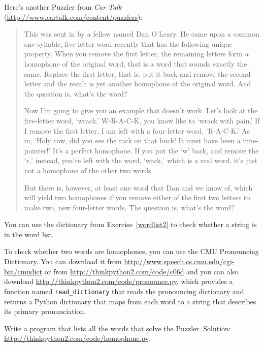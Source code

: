 \documentclass[10pt]{book}
\begin{document}
\begin{exercise}

Here's another Puzzler from {\em Car Talk}
(\url{http://www.cartalk.com/content/puzzlers}):

\begin{quote}
This was sent in by a fellow named Dan O'Leary. He came upon a common
one-syllable, five-letter word recently that has the following unique
property. When you remove the first letter, the remaining letters form
a homophone of the original word, that is a word that sounds exactly
the same. Replace the first letter, that is, put it back and remove
the second letter and the result is yet another homophone of the
original word. And the question is, what's the word?

Now I'm going to give you an example that doesn't work. Let's look at
the five-letter word, `wrack.' W-R-A-C-K, you know like to `wrack with
pain.' If I remove the first letter, I am left with a four-letter
word, 'R-A-C-K.' As in, `Holy cow, did you see the rack on that buck!
It must have been a nine-pointer!' It's a perfect homophone. If you
put the `w' back, and remove the `r,' instead, you're left with the
word, `wack,' which is a real word, it's just not a homophone of the
other two words.

But there is, however, at least one word that Dan and we know of,
which will yield two homophones if you remove either of the first two
letters to make two, new four-letter words. The question is, what's
the word?
\end{quote}

You can use the dictionary from Exercise~\ref{wordlist2} to check
whether a string is in the word list.

To check whether two words are homophones, you can use the CMU
Pronouncing Dictionary.  You can download it from
\url{http://www.speech.cs.cmu.edu/cgi-bin/cmudict} or from
\url{http://thinkpython2.com/code/c06d} and you can also download
\url{http://thinkpython2.com/code/pronounce.py}, which provides a function
named \verb"read_dictionary" that reads the pronouncing dictionary and
returns a Python dictionary that maps from each word to a string that
describes its primary pronunciation.

Write a program that lists all the words that solve the Puzzler.
Solution: \url{http://thinkpython2.com/code/homophone.py}.

\end{exercise}
\end{document}
